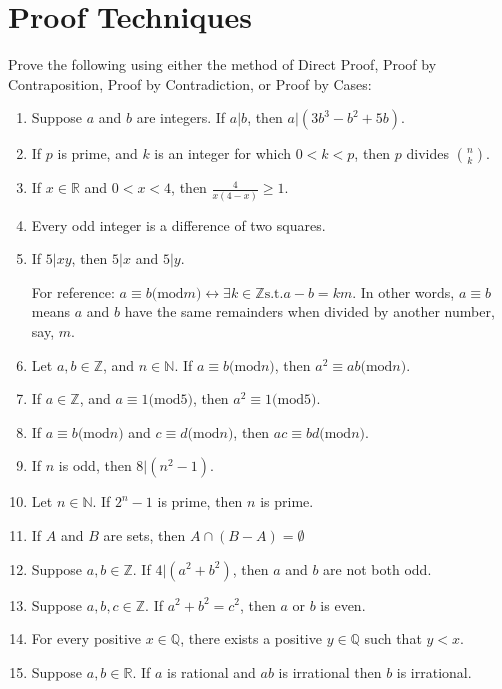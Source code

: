 \documentclass{article}
\begin{document}
    \section{Proof Techniques}
		Prove the following using either the method of Direct Proof, Proof by Contraposition, Proof by Contradiction, or Proof by Cases:
	\begin{enumerate}
		
		\item Suppose $a$ and $b$ are integers. If $a \lvert b$, then $a \lvert (3b^{3}-b^{2} +5b)$.
		\item If $p$ is prime, and $k$ is an integer for which $0 < k < p$, then $p$ divides $\binom n k$.
		\item If $x \in \mathbb{R}$ and $0 < x < 4$, then $\frac{4}{x(4 - x)} \ge 1$.
		\item Every odd integer is a difference of two squares.
		\item If $5 \lvert xy$, then $5\lvert x$ and $5 \lvert y$.

		For reference: $a\equiv b \mathrm{(mod }m\mathrm{)} \leftrightarrow \exists k \in \mathbb{Z} \mathrm{s.t.} a - b = km$. In other words, $a \equiv b$ means $a$ and $b$ have the same remainders when divided by another number, say, $m$.

		\item Let $a, b\in \mathbb{Z}$, and $n\in\mathbb{N}$. If $a \equiv b \mathrm{(mod }n \mathrm{)}$, then $a^{2} \equiv ab \mathrm{(mod }n\mathrm{)}$.

		\item If $a \in \mathbb{Z}$, and $a \equiv 1 \mathrm{(mod } 5 \mathrm{)}$, then $a^{2} \equiv 1 \mathrm{(mod }5\mathrm{)}$.

		\item If $a \equiv b \mathrm{(mod }n\mathrm{)}$ and $c \equiv d \mathrm{(mod }n\mathrm{)}$, then $ac \equiv bd \mathrm{(mod }n\mathrm{)}$.	

		\item If $n$ is odd, then $8 \lvert (n^{2} - 1)$.

		\item Let $n \in \mathbb{N}$. If $2^{n} - 1$ is prime, then $n$ is prime.
		
		\item If $A$ and $B$ are sets, then $A \cap (B - A) = \emptyset$

		\item Suppose $a, b \in \mathbb{Z}$. If $4 \lvert (a^{2} + b^{2})$, then $a$ and $b$ are not both odd.

		\item Suppose $a, b, c \in \mathbb{Z}$. If $a^{2} + b^{2}= c^{2}$, then  $a$ or $b$ is even.

		\item For every positive $x \in \mathbb{Q}$, there exists a positive $y \in \mathbb{Q}$ such that $y < x$.

		\item Suppose $a, b \in \mathbb{R}$. If $a$ is rational and $ab$ is irrational then $b$ is irrational.
	\end{enumerate}
\end{document}
